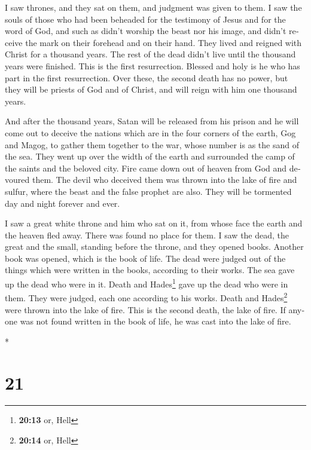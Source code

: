\begin{paracol}{2}
\begin{otherlanguage}{english}
 I saw thrones, and they sat on them, and judgment was
given to them. I saw the souls of those who had been beheaded for the
testimony of Jesus and for the word of God, and such as didn't worship
the beast nor his image, and didn't receive the mark on their forehead
and on their hand. They lived and reigned with Christ for a thousand
years.  The rest of the dead didn't live until the
thousand years were finished. This is the first resurrection.
 Blessed and holy is he who has part in the first
resurrection. Over these, the second death has no power, but they will
be priests of God and of Christ, and will reign with him one thousand
years.

 And after the thousand years, Satan will be released from
his prison  and he will come out to deceive the nations
which are in the four corners of the earth, Gog and Magog, to gather
them together to the war, whose number is as the sand of the sea.
 They went up over the width of the earth and surrounded
the camp of the saints and the beloved city. Fire came down out of
heaven from God and devoured them.  The devil who
deceived them was thrown into the lake of fire and sulfur, where the
beast and the false prophet are also. They will be tormented day and
night forever and ever.

 I saw a great white throne and him who sat on it, from
whose face the earth and the heaven fled away. There was found no place
for them.  I saw the dead, the great and the small,
standing before the throne, and they opened books. Another book was
opened, which is the book of life. The dead were judged out of the
things which were written in the books, according to their works.
 The sea gave up the dead who were in it. Death and
Hades\footnote{\textbf{20:13} or, Hell} gave up the dead who were in
them. They were judged, each one according to his works. 
Death and Hades\footnote{\textbf{20:14} or, Hell} were thrown into the
lake of fire. This is the second death, the lake of fire.
 If anyone was not found written in the book of life, he
was cast into the lake of fire.

\end{otherlanguage}

\switchcolumn[0]*

\hypertarget{section-40}{%
\section{21}\label{section-40}}


\end{paracol}

